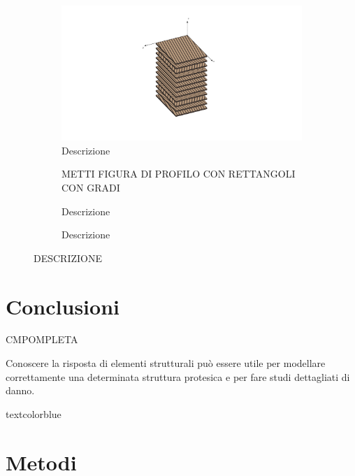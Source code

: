 \documentclass[a4paper,num-refs]{oup-contemporary}
\begin{document}
\begin{figure}[bt!]
	\centering
	\begin{subfigure}[t]{0.3\textwidth}
		\centering
		
		\includegraphics[width=\textwidth]{struct5.pdf}
		\caption{Descrizione}
			\label{fig:last_case_schema}
	\end{subfigure}
	\hfill
	\begin{subfigure}[t]{0.3\textwidth}
		\centering
		METTI FIGURA DI PROFILO CON RETTANGOLI CON GRADI
		\caption{Descrizione}
		
	\end{subfigure}
	\hfill
	\begin{subfigure}[t]{0.3\textwidth}
		\centering
		\caption{Descrizione}
		
	\end{subfigure}
	\hfill
	\caption{ DESCRIZIONE }
	\label{fig:last_case}
\end{figure}

\textcolor{blue}{\lipsum[1-2]}


\section{Conclusioni}


CMPOMPLETA

Conoscere la risposta di elementi strutturali può essere utile per modellare correttamente una determinata struttura protesica e per fare studi dettagliati  di danno.

textcolor{blue}{\lipsum[1-2]}
\section{Metodi}
\end{document}
